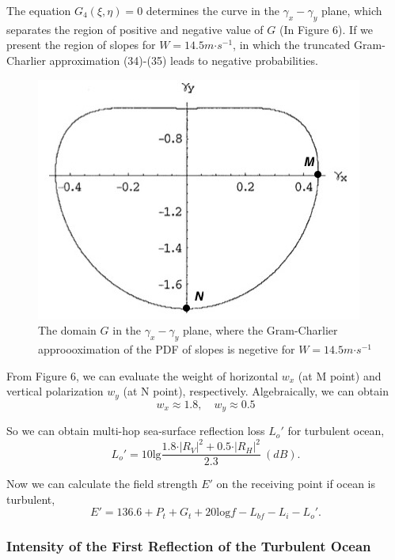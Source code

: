 \documentclass{mcmthesis}
\begin{document}
The equation $G_4(\xi, \eta) = 0$ determines the curve in the $\gamma_x-\gamma_y$ plane, which separates the region of positive and negative value of $G$ (In Figure 6).
If we present the region of slopes for $W=14.5m\bm\cdot s^{-1}$, in which the truncated Gram-Charlier approximation (34)-(35) leads to negative probabilities.
\begin{figure}[!htbp]
    \centering
    \includegraphics[scale=0.4]{figure/slope.jpeg}
    \centering
    \caption{The domain $G$ in the $\gamma_x-\gamma_y$ plane, where the Gram-Charlier approooximation of the PDF of slopes is negetive for $W = 14.5m\bm\cdot s^{-1}$}
    \label{fig:myphoto1}
    \end{figure}
    
From Figure 6, we can evaluate the weight of horizontal $w_x$ (at M point) and vertical polarization $w_y$ (at N point), respectively. Algebraically, we can obtain
\begin{equation}
w_x \approx 1.8,\quad w_y \approx 0.5
\end{equation}

So we can obtain multi-hop sea-surface reflection loss $L_o'$ for turbulent ocean,
\begin{equation}
L_o' = 10\mathrm{lg}\displaystyle\frac{1.8\bm\cdot|R_V|^2 + 0.5\bm\cdot|R_H|^2}{2.3} ~(dB).
\end{equation}

Now we can calculate the field strength $E'$ on the receiving point  if ocean is turbulent, 
\begin{equation}
E' = 136.6+P_t+G_t+20\mathrm{log} f-L_{bf}-L_i-L_o'. 
\end{equation}
\subsubsection{Intensity of the First Reflection of the Turbulent Ocean}
\end{document}
